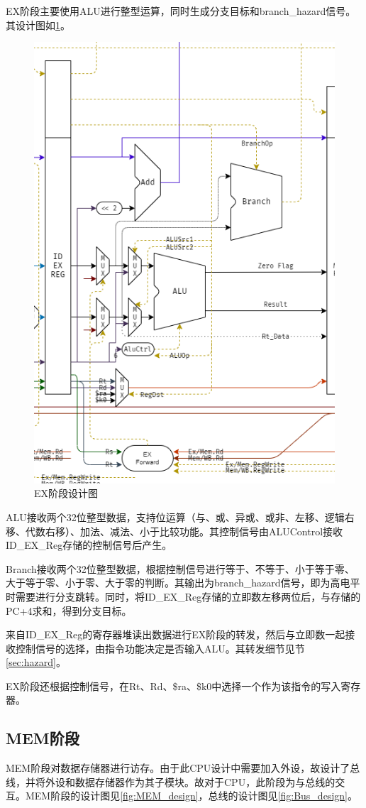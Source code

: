 \documentclass[a4paper]{article}
\begin{document}
EX阶段主要使用ALU进行整型运算，同时生成分支目标和branch\_hazard信号。其设计图如\ref{fig:EX_design}。

\begin{figure}[htb]
    \centering
    \includegraphics[width=.3\textwidth]{../assets/design_EX.png}
    \caption{EX阶段设计图}
    \label{fig:EX_design}
\end{figure}

ALU接收两个32位整型数据，支持位运算（与、或、异或、或非、左移、逻辑右移、代数右移）、加法、减法、小于比较功能。其控制信号由ALUControl接收ID\_EX\_Reg存储的控制信号后产生。

Branch接收两个32位整型数据，根据控制信号进行等于、不等于、小于等于零、大于等于零、小于零、大于零的判断。其输出为branch\_hazard信号，即为高电平时需要进行分支跳转。同时，将ID\_EX\_Reg存储的立即数左移两位后，与存储的PC+4求和，得到分支目标。

来自ID\_EX\_Reg的寄存器堆读出数据进行EX阶段的转发，然后与立即数一起接收控制信号的选择，由指令功能决定是否输入ALU。其转发细节见节\ref{sec:hazard}。

EX阶段还根据控制信号，在Rt、Rd、\$ra、\$k0中选择一个作为该指令的写入寄存器。

\subsection{MEM阶段}

MEM阶段对数据存储器进行访存。由于此CPU设计中需要加入外设，故设计了总线，并将外设和数据存储器作为其子模块。故对于CPU，此阶段为与总线的交互。MEM阶段的设计图见\ref{fig:MEM_design}，总线的设计图见\ref{fig:Bus_design}。
\end{document}
